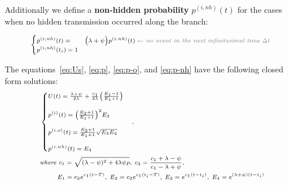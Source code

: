 \documentclass[a4paper,10pt]{article}
\begin{document}
Additionally we define a \textbf{non-hidden probability} $p^{(i,nh)}(t)$ for the cases when no hidden transmission occurred along the branch:

\begin{equation}
\scriptsize
\begin{cases}
\dot{p}^{(i,nh)}(t) = & \Big(\lambda + \psi\Big) p^{(i,nh)}(t)\; \textit{\color{gray} $\leftarrow$ no event in the next infinitesimal time $\Delta t$ }\\
p^{(i,nh)}(t_i) = 1\label{eq:p-nh}
\end{cases}
\end{equation}

The equations~\ref{eq:Us}, \ref{eq:p}, \ref{eq:p-o}, and \ref{eq:p-nh} have the following closed form solutions:
\begin{equation}
\scriptsize
\begin{split}
&\begin{cases}
U(t) = \frac{\lambda + \psi}{2\lambda} +  \frac{c_1}{2\lambda}\Big(\frac{E_1 - 1}{E_1 + 1}\Big)\\
\\
p^{(i)}(t) = \Big(\frac{E_2 + 1}{E_1 + 1}\Big)^2E_3 \\
\\
p^{(i,o)}(t) =  \frac{E_2 + 1}{E_1 + 1}\sqrt{E_3E_4} \\
\\
p^{(i,nh)}(t) =  E_4
\end{cases},\\
& \textit{where } c_1 = \sqrt{(\lambda - \psi)^2 + 4 \lambda\psi\rho},\; c_2 = \frac{c_1 + \lambda - \psi}{c_1 - \lambda + \psi},\\
& ~~~~~~~~E_1 = c_2 e^{c_1 (t -T)},\; E_2 = c_2 e^{c_1 (t_i -T)},\; E_3 = e^{c_1 (t -t_i)}, \; E_4 =  e^{(\lambda + \psi) (t -t_i)}\\
\end{split}\label{eq:ps}
\end{equation}


%
%
\end{document}
